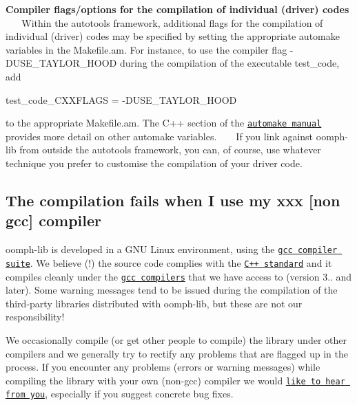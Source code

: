 \begin{DoxyEnumerate}
\item {\bfseries Compiler flags/options for the compilation of individual (driver) codes} ~\newline
~\newline
 Within the {\ttfamily autotools} framework, additional flags for the compilation of individual (driver) codes may be specified by setting the appropriate automake variables in the {\ttfamily Makefile}.{\ttfamily am}. For instance, to use the compiler flag {\ttfamily -\/\+D\+U\+S\+E\+\_\+\+T\+A\+Y\+L\+O\+R\+\_\+\+H\+O\+OD} during the compilation of the executable {\ttfamily test\+\_\+code}, add 
\begin{DoxyCode}
test\_code\_CXXFLAGS = -DUSE\_TAYLOR\_HOOD
\end{DoxyCode}
 to the appropriate {\ttfamily Makefile}.{\ttfamily am}. The C++ section of the \href{http://www.gnu.org/software/automake/manual/automake.html}{\tt automake manual} provides more detail on other {\ttfamily automake} variables. ~\newline
~\newline
 If you link against {\ttfamily oomph-\/lib} from outside the {\ttfamily autotools} framework, you can, of course, use whatever technique you prefer to customise the compilation of your driver code.
\end{DoxyEnumerate}

\hypertarget{index_other_compilers}{}\subsection{The compilation fails when I use my xxx \mbox{[}non gcc\mbox{]} compiler}\label{index_other_compilers}
{\ttfamily oomph-\/lib} is developed in a G\+NU Linux environment, using the \href{http://gcc.gnu.org/}{\tt gcc compiler suite}. We believe (!) the source code complies with the \href{http://www.open-std.org/jtc1/sc22/wg21/}{\tt C++ standard} and it compiles cleanly under the \href{http://gcc.gnu.org/}{\tt gcc compilers} that we have access to (version 3.. and later). Some warning messages tend to be issued during the compilation of the third-\/party libraries distributed with {\ttfamily oomph-\/lib}, but these are not our responsibility!

We occasionally compile (or get other people to compile) the library under other compilers and we generally try to rectify any problems that are flagged up in the process. If you encounter any problems (errors or warning messages) while compiling the library with your own (non-\/gcc) compiler we would \href{../../contact/html/index.html}{\tt like to hear from you}, especially if you suggest concrete bug fixes.

